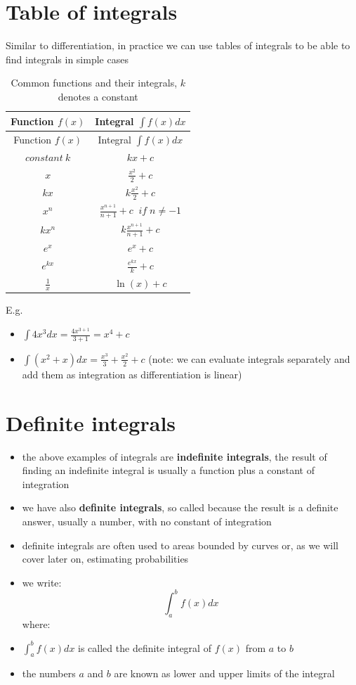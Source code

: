 \documentclass[
]{book}
\providecommand{\tightlist}{%
  \setlength{\itemsep}{0pt}\setlength{\parskip}{0pt}}
\theoremstyle{definition}
\theoremstyle{definition}
\theoremstyle{definition}
\theoremstyle{remark}
\begin{document}
\hypertarget{table-of-integrals}{%
\section{Table of integrals}\label{table-of-integrals}}

Similar to differentiation, in practice we can use tables of integrals to be able to find integrals in simple cases

\begin{longtable}[]{@{}cc@{}}
\caption{\label{tab:int-table} Common functions and their integrals, \(k\) denotes a constant}\tabularnewline
\toprule
Function \(f(x)\) & Integral \(\int f(x) dx\)\tabularnewline
\midrule
\endfirsthead
\toprule
Function \(f(x)\) & Integral \(\int f(x) dx\)\tabularnewline
\midrule
\endhead
\(constant\:k\) & \(kx + c\)\tabularnewline
\(x\) & \(\frac{x^2}{2}+c\)\tabularnewline
\(kx\) & \(k\frac{x^2}{2}+c\)\tabularnewline
\(x^n\) & \(\frac{x^{n+1}}{n+1}+c\;\; if\;n\neq-1\)\tabularnewline
\(kx^n\) & \(k\frac{x^{n+1}}{n+1}+c\)\tabularnewline
\(e^x\) & \(e^x+c\)\tabularnewline
\(e^{kx}\) & \(\frac{e^{kx}}{k}+c\)\tabularnewline
\(\frac{1}{x}\) & \(\ln(x)+c\)\tabularnewline
\bottomrule
\end{longtable}

E.g.

\begin{itemize}
\tightlist
\item
  \(\int 4x^3 dx = \frac{4x^{3+1}}{3+1}=x^4 + c\)
\item
  \(\int (x^2 + x) dx = \frac{x^3}{3} + \frac{x^2}{2} +c\) (note: we can evaluate integrals separately and add them as integration as differentiation is linear)
\end{itemize}

\hypertarget{definite-integrals}{%
\section{Definite integrals}\label{definite-integrals}}

\begin{itemize}
\item
  the above examples of integrals are \textbf{indefinite integrals}, the result of finding an indefinite integral is usually a function plus a constant of integration
\item
  we have also \textbf{definite integrals}, so called because the result is a definite answer, usually a number, with no constant of integration
\item
  definite integrals are often used to areas bounded by curves or, as we will cover later on, estimating probabilities
\item
  we write: \[\int_{a}^bf(x)dx\] where:
\item
  \(\int_{a}^bf(x)dx\) is called the definite integral of \(f(x)\) from \(a\) to \(b\)
\item
  the numbers \(a\) and \(b\) are known as lower and upper limits of the integral
\end{itemize}
\end{document}
